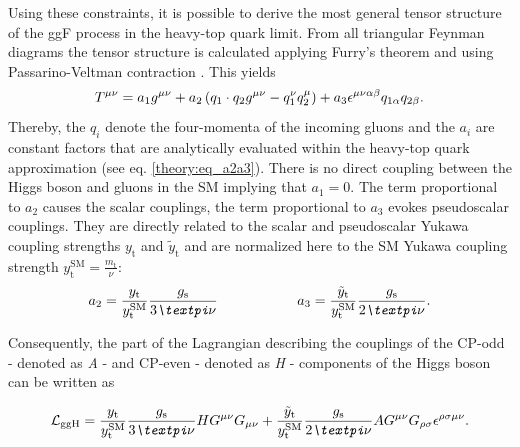 Using these constraints, it is possible to derive the most general tensor structure of the ggF process in the heavy-top quark limit. 
From all triangular Feynman diagrams the tensor structure is calculated applying Furry's theorem and using Passarino-Veltman contraction \cite{Heinemeyer:2013tqa}. This yields
\begin{equation}
    T^{\mu\nu} = a_\text{1} g^{\mu\nu} + a_\text{2} \left( q_\text{1}\cdot q_\text{2} g^{\mu\nu} - q_\text{1}^{\nu}q_\text{2}^{\mu} \right) + a_\text{3} \epsilon^{\mu\nu\alpha\beta}q_{\text{1}\alpha}q_{\text{2}\beta}.
\end{equation} 
Thereby, the $q_i$ denote the four-momenta of the incoming gluons and the $a_i$ are constant factors that are analytically evaluated within the heavy-top quark approximation (see eq. \eqref{theory:eq_a2a3}).
There is no direct coupling between the Higgs boson and gluons in the SM implying that $a_\text{1} = 0$. 
The term proportional to $a_\text{2}$ causes the scalar couplings, the term proportional to $a_3$ evokes pseudoscalar couplings. 
They are directly related to the scalar and pseudoscalar Yukawa coupling strengths $y_\text{t}$ and $\tilde{y}_\text{t}$ and are normalized here to the SM Yukawa coupling strength $y_\text{t}^\text{SM} = \frac{m_\text{t}}{\nu}$:   
\begin{equation}\label{theory:eq_a2a3}
    a_\text{2} = \frac{y_\text{t}}{y_\text{t}^\text{SM}}\frac{g_\text{s}}{3\pi\nu} \ttab \ttab a_\text{3} = \frac{\tilde{y}_\text{t}}{y_\text{t}^\text{SM}}\frac{g_\text{s}}{2\pi\nu}.
\end{equation}

Consequently, the part of the Lagrangian describing the couplings of the CP-odd \-- denoted as \textit{A} \-- and CP-even \-- denoted as \textit{H} \-- components of the Higgs boson
can be written as
 
\begin{equation}
    \Lagr_\text{ggH} =  \frac{y_\text{t}}{y_\text{t}^\text{SM}}\frac{g_\text{s}}{3\pi\nu}HG^{\mu\nu}G_{\mu\nu} + \frac{\tilde{y}_\text{t}}{y_\text{t}^\text{SM}}\frac{g_\text{s}}{2\pi\nu} A G^{\mu\nu}G_{\rho\sigma}\epsilon^{\rho\sigma\mu\nu}.
\end{equation}

